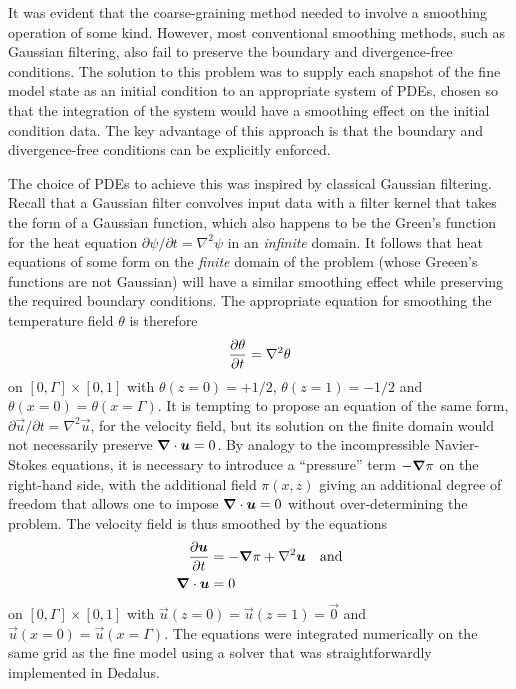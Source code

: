 \documentclass[../main.tex]{subfiles}
\begin{document}
It was evident that the coarse-graining method needed to involve a smoothing
operation of some kind. However, most conventional smoothing methods, such as
Gaussian filtering, also fail to preserve the boundary and divergence-free
conditions. The solution to this problem was to supply each snapshot of the
fine model state as an initial condition to an appropriate system of PDEs,
chosen so that the integration of the system would have a smoothing effect on
the initial condition data. The key advantage of this approach is that the
boundary and divergence-free conditions can be explicitly enforced.

The choice of PDEs to achieve this was inspired by classical Gaussian
filtering. Recall that a Gaussian filter convolves input data with a filter
kernel that takes the form of a Gaussian function, which also happens to be the
Green's function for the heat equation $\partial \psi / \partial t = \nabla^2
\psi$ in an \emph{infinite} domain. It follows that heat equations of some form
on the \emph{finite} domain of the \rb{} problem (whose Greeen's functions are
not Gaussian) will have a similar smoothing effect while preserving the
required boundary conditions. The appropriate equation for smoothing the
temperature field $\theta$ is therefore
\begin{equation}
    \label{eqn:diffusion_theta}
    \frac{\partial \theta}{\partial t} = \nabla^2 \theta
\end{equation}
on $[0, \Gamma] \times [0, 1]$ with $\theta(z=0) = +1/2$, $\theta(z=1) = -1/2$
and $\theta(x=0) = \theta(x=\Gamma)$. It is tempting to propose an equation of
the same form, $\partial \vec{u} / \partial t = \nabla^2 \vec{u}$, for the
velocity field, but its solution on the finite domain would not necessarily
preserve $\bm{\nabla} \cdot \bm{u} = 0$. By analogy to the incompressible
Navier-Stokes equations, it is necessary to introduce a ``pressure'' term
$-\bm{\nabla}\pi$ on the right-hand side, with the additional field $\pi(x,z)$ giving
an additional degree of freedom that allows one to impose $\bm{\nabla} \cdot \bm{u}
= 0$ without over-determining the problem. The velocity field is thus
smoothed by the equations
\begin{align}
    \label{eqn:diffusion_u}
    \frac{\partial \bm{u}}{\partial t} &= -\bm{\nabla}\pi + \nabla^2 \bm{u} \quad \text{and} \\
    \label{eqn:diffusion_continuity}
    \bm{\nabla} \cdot \bm{u} &= 0
\end{align}
on $[0, \Gamma] \times [0, 1]$ with $\vec{u}(z=0) = \vec{u}(z=1) = \vec{0}$ and
$\vec{u}(x=0) = \vec{u}(x=\Gamma)$. The equations
 were integrated
numerically on the same grid as the fine model using a solver that was
straightforwardly implemented in Dedalus.
\end{document}
